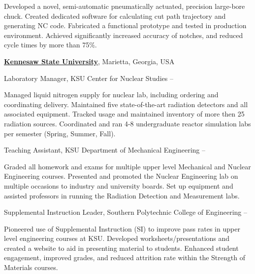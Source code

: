 \documentclass[letterpaper,MMMyyyy,nonstopmode]{resume}
\begin{document}
\begin{Body}

\begin{Detail}
\SubBulletItem
Developed a novel, semi-automatic pneumatically actuated, precision large-bore chuck.
\SubBulletItem
Created dedicated software for calculating cut path trajectory and generating NC code.
\SubBulletItem
Fabricated a functional prototype and tested in production environment.
\SubBulletItem
Achieved significantly increased accuracy of notches, and reduced cycle times by more than 75\%.
\end{Detail}


\BigGap
\Entry
\href{http://kennesaw.edu/}
{\textbf{Kennesaw State University}},
Marietta, Georgia, USA

\Gap
\BulletItem
Laboratory Manager,
KSU Center for Nuclear Studies
\hfill
{} --
\begin{Detail}
\SubBulletItem
Managed liquid nitrogen supply for nuclear lab, including ordering and coordinating delivery.
\SubBulletItem
Maintained five state-of-the-art radiation detectors and all associated equipment.
\SubBulletItem
Tracked usage and maintained inventory of more then 25 radiation sources.
\SubBulletItem
Coordinated and ran 4-8 undergraduate reactor simulation labs per semester (Spring, Summer, Fall).
\end{Detail}

\Gap
\BulletItem
Teaching Assistant,
KSU Department of Mechanical Engineering
\hfill
{} --
\begin{Detail}
\SubBulletItem
Graded all homework and exams for multiple upper level Mechanical and Nuclear Engineering courses.
\SubBulletItem
Presented and promoted the Nuclear Engineering lab on multiple occasions to industry and university boards.
\SubBulletItem
Set up equipment and assisted professors in running the Radiation Detection and Measurement labs.
\end{Detail}

\Gap
\BulletItem
Supplemental Instruction Leader,
Southern Polytechnic College of Engineering
\hfill
{} --
\begin{Detail}
\SubBulletItem
Pioneered use of Supplemental Instruction (SI) to improve pass rates in upper level engineering courses at KSU.
\SubBulletItem
Developed worksheets/presentations and created a website to aid in presenting material to students.
\SubBulletItem
Enhanced student engagement, improved grades, and reduced attrition rate within the Strength of Materials courses.
\end{Detail}



\end{Body}
\end{document}

